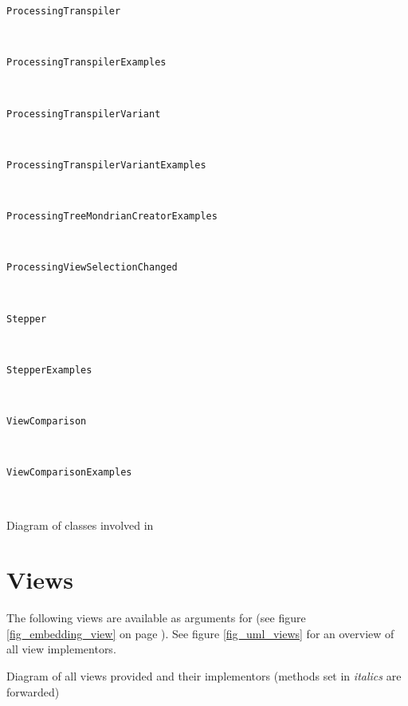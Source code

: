 \begin{description}
\item[\texttt{ProcessingTranspiler}] \hfill \\
	
\item[\texttt{ProcessingTranspilerExamples}] \hfill \\
	
\item[\texttt{ProcessingTranspilerVariant}] \hfill \\
	
\item[\texttt{ProcessingTranspilerVariantExamples}] \hfill \\
	
\item[\texttt{ProcessingTreeMondrianCreatorExamples}] \hfill \\
	
\item[\texttt{ProcessingViewSelectionChanged}] \hfill \\
	
\item[\texttt{Stepper}] \hfill \\
	
\item[\texttt{StepperExamples}] \hfill \\
	
\item[\texttt{ViewComparison}] \hfill \\
	
\item[\texttt{ViewComparisonExamples}] \hfill \\
	

\end{description}


\begin{cfigure}{Diagram of classes involved in }

\end{cfigure}


\section{Views}

The following views are available as arguments for  (see figure \ref{fig_embedding_view} on page \pageref{fig_embedding_view}). See figure \ref{fig_uml_views} for an overview of all view implementors.

\begin{cfigure}{Diagram of all views provided and their implementors (methods set in \textit{italics} are forwarded)}

\end{cfigure}

